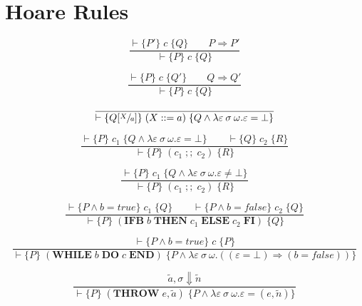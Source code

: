\section{Hoare Rules}

\begin{equation}\label{eqn:hoare-cons-pre}
\frac{\vdash\{P'\} \; c \; \{Q\} \qquad P \Rightarrow P'}{\vdash\{P\} \; c \; \{Q\}}
\end{equation}

\begin{equation}\label{eqn:hoare-cons-post}
\frac{\vdash\{P\} \; c \; \{Q'\} \qquad Q \Rightarrow Q'}{\vdash\{P\} \; c \; \{Q\}}
\end{equation}

\begin{equation}\label{eqn:hoare-assign}
\frac{}{\vdash \{Q[\sfrac{X}{a}]\} \; (X ::= a) \; \{Q \wedge \lambda \varepsilon\:\sigma\:\omega. \varepsilon = \bot\}}
\end{equation}

\begin{equation}\label{eqn:hoare-seq}
\frac{\vdash \{P\} \; c_1 \; \{Q \wedge \lambda \varepsilon\:\sigma\:\omega. \varepsilon = \bot\} \qquad \vdash \{Q\} \; c_2 \; \{R\}}{\vdash \{P\} \; (c_1\; ;;\; c_2) \; \{R\}}
\end{equation}

\begin{equation}\label{eqn:hoare-seq-exn}
\frac{\vdash \{P\} \; c_1 \; \{Q \wedge \lambda \varepsilon\:\sigma\:\omega. \varepsilon \neq \bot\}}{\vdash \{P\} \; (c_1\; ;;\; c_2) \; \{R\}}
\end{equation}

\begin{equation}
\frac{\vdash \{P \wedge b=true\} \; c_1 \; \{Q\} \qquad \vdash \{P \wedge b=false\} \; c_2 \; \{Q\}}{\vdash \{P\} \; (\textbf{IFB}\; b\; \textbf{THEN}\; c_1\; \textbf{ELSE}\; c_2\; \textbf{FI}) \; \{Q\}}
\end{equation}

\begin{equation}
\frac{\vdash \{P \wedge b = true\} \; c \; \{P\}}{\vdash \{P\} \; (\textbf{WHILE}\; b\; \textbf{DO}\; c\; \textbf{END}) \; \{P \wedge \lambda \varepsilon\:\sigma\:\omega.((\varepsilon = \bot) \Rightarrow (b = false))\}}
\end{equation}

\begin{equation}\label{eqn:hoare-throw}
\frac{\tilde{a}, \sigma \Downarrow \tilde{n}}{\vdash \{P\} \; (\textbf{THROW}\; e, \tilde{a}) \; \{P \wedge \lambda \varepsilon\:\sigma\:\omega. \varepsilon = (e, \tilde{n})\}}
\end{equation}


